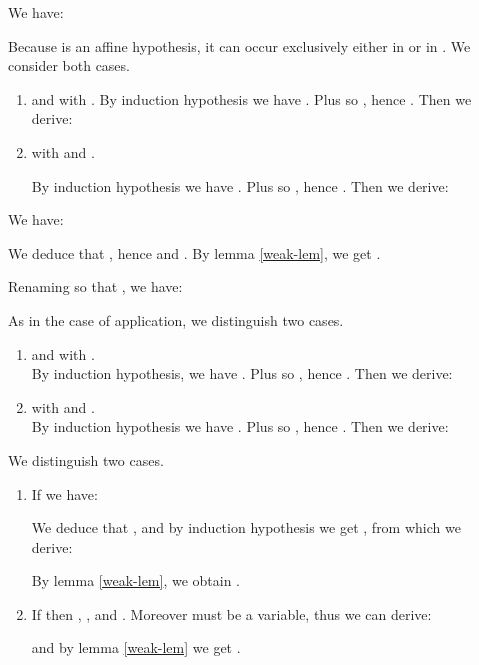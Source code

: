 \documentclass[11pt]{article}
\newcommand{\qed}{\hfill}
\begin{document}
  \begin{description}

  \item[] We have:
    

Because  is an affine hypothesis, it can occur 
exclusively either in  or in . We consider both cases.
    \begin{enumerate}

   \item  and  with .
      By induction hypothesis we have . Plus  so , hence . Then we derive:
      

\item  with  and
  .

By induction hypothesis we have . Plus 
so , hence . Then we derive:
      
    \end{enumerate}


    \item[] We have:
      
      We deduce that , hence  and . By lemma \ref{weak-lem}, we get . \\


  \item[] Renaming  so that , we have:
    
    As in the case of application, we distinguish two cases.

    \begin{enumerate}

    \item  and  with .\\
      By induction hypothesis, we have . Plus  so , hence . Then we derive:
      

    \item  with  and .\\
      By induction hypothesis we have . Plus  so , hence . Then we derive:
      
    \end{enumerate}


  \item[] We distinguish two cases. \\

\begin{enumerate}

\item  If  we have:
    
    We deduce that , and by
    induction hypothesis we get , from which we
    derive:
    
    By lemma \ref{weak-lem}, 
we obtain .
    
\item    If  then ,
    , and . Moreover  must be a variable, 
thus we can derive:
    
    and by lemma \ref{weak-lem} we get . \qed

\end{enumerate}
  \end{description}
\end{document}

